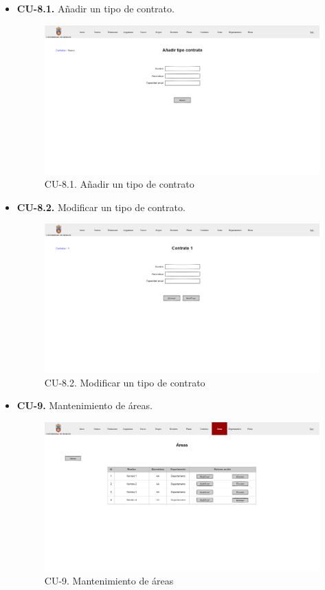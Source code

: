 \begin{itemize}
	\item \textbf{CU-8.1.} Añadir un tipo de contrato.
	\begin{figure}[!h]
		\centering
		\includegraphics[width=\textwidth]{../img/Anexos/Vistas/add_contrato.png}
		\caption{CU-8.1. Añadir un tipo de contrato}\label{fig:../img/Anexos/Vistas/add_contrato.png}
	\end{figure}
	
	\item \textbf{CU-8.2.} Modificar un tipo de contrato.
	\begin{figure}[!h]
		\centering
		\includegraphics[width=\textwidth]{../img/Anexos/Vistas/mod_contrato.png}
		\caption{CU-8.2. Modificar un tipo de contrato}\label{fig:../img/Anexos/Vistas/mod_contrato.png}
	\end{figure}
	
	\item \textbf{CU-9.} Mantenimiento de áreas.
	\begin{figure}[!h]
		\centering
		\includegraphics[width=\textwidth]{../img/Anexos/Vistas/areas.png}
		\caption{CU-9. Mantenimiento de áreas}\label{fig:../img/Anexos/Vistas/areas.png}
	\end{figure}
	

\end{itemize}
